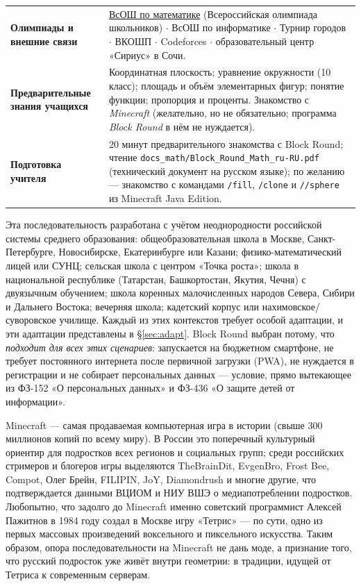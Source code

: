\documentclass[12pt,a4paper]{scrartcl}
\newcommand{\cmd}[1]{\textcolor{earth}{\texttt{\small #1}}}
\begin{document}
\begin{center}
\begin{tabular}{@{}p{}p{}@{}}
\addlinespace[2pt]
\textbf{Олимпиады и внешние связи} & \hyperref[sec:olimp]{ВсОШ по математике} (Всероссийская олимпиада школьников) $\cdot$ ВсОШ по информатике $\cdot$ Турнир городов $\cdot$ ВКОШП $\cdot$ Codeforces $\cdot$ образовательный центр «Сириус» в Сочи. \\
\addlinespace[2pt]
\textbf{Предварительные знания учащихся} & Координатная плоскость; уравнение окружности (10 класс); площадь и объём элементарных фигур; понятие функции; пропорция и проценты. Знакомство с \emph{Minecraft} (желательно, но не обязательно; программа \emph{Block Round} в нём не нуждается). \\
\addlinespace[2pt]
\textbf{Подготовка учителя} & 20 минут предварительного знакомства с Block Round; чтение \texttt{docs\_math/Block\_Round\_Math\_ru-RU.pdf} (технический документ на русском языке); по желанию --- знакомство с командами \cmd{/fill}, \cmd{/clone} и \cmd{//sphere} из Minecraft Java Edition. \\
\bottomrule
\end{tabular}
\end{center}

\begin{zametka}
Эта последовательность разработана с учётом неоднородности российской системы среднего образования: общеобразовательная школа в Москве, Санкт-Петербурге, Новосибирске, Екатеринбурге или Казани; физико-математический лицей или СУНЦ; сельская школа с центром «Точка роста»; школа в национальной республике (Татарстан, Башкортостан, Якутия, Чечня) с двуязычным обучением; школа коренных малочисленных народов Севера, Сибири и Дальнего Востока; вечерняя школа; кадетский корпус или нахимовское/суворовское училище. Каждый из этих контекстов требует особой адаптации, и эти адаптации представлены в §\ref{sec:adapt}. Block Round выбран потому, что \emph{подходит для всех этих сценариев}: запускается на бюджетном смартфоне, не требует постоянного интернета после первичной загрузки (PWA), не нуждается в регистрации и не собирает персональных данных --- условие, прямо вытекающее из ФЗ-152 «О персональных данных» и ФЗ-436 «О защите детей от информации».
\end{zametka}

\begin{minecraft}
Minecraft --- самая продаваемая компьютерная игра в истории (свыше 300 миллионов копий по всему миру). В России это поперечный культурный ориентир для подростков всех регионов и социальных групп; среди российских стримеров и блогеров игры выделяются TheBrainDit, EvgenBro, Frost Bee, Compot, Олег Брейн, FILIPIN, JoY, Diamondrush и многие другие, что подтверждается данными ВЦИОМ и НИУ ВШЭ о медиапотреблении подростков. Любопытно, что задолго до Minecraft именно советский программист Алексей Пажитнов в 1984 году создал в Москве игру «Тетрис» --- по сути, одно из первых массовых произведений воксельного и пиксельного искусства. Таким образом, опора последовательности на Minecraft не дань моде, а признание того, что русский подросток уже живёт внутри геометрии: в традиции, идущей от Тетриса к современным серверам.
\end{minecraft}
\end{document}

